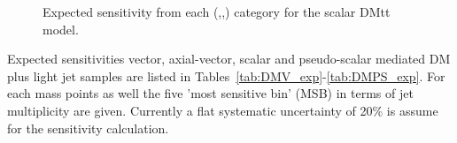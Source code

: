 \begin{figure}[h!] \centering
{}
\caption{Expected sensitivity from each (\nj,\nb,\scalht) category for the scalar DMtt model.}
\label{fig:DMttS-sensitivity} 
\end{figure}

Expected sensitivities vector, axial-vector, scalar and pseudo-scalar mediated DM plus light jet samples are listed in Tables~\ref{tab:DMV_exp}-\ref{tab:DMPS_exp}. For each mass points as well the five 'most sensitive bin' (MSB) in terms of jet multiplicity are given. Currently a flat systematic uncertainty of 20\% is assume for the sensitivity calculation.

